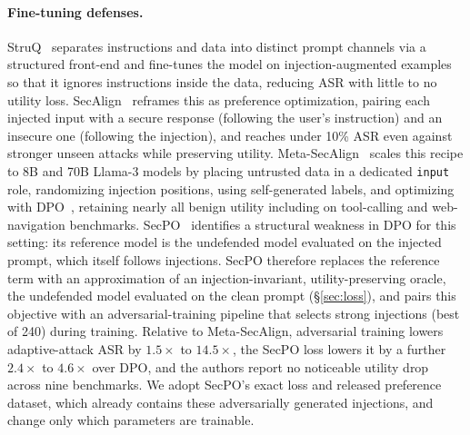 \documentclass{article}
\begin{document}
\paragraph{Fine-tuning defenses.} StruQ~\cite{chen2025struq} separates instructions and data into distinct prompt channels via a structured front-end and fine-tunes the model on injection-augmented examples so that it ignores instructions inside the data, reducing ASR with little to no utility loss. SecAlign~\cite{chen2024secalign} reframes this as preference optimization, pairing each injected input with a secure response (following the user's instruction) and an insecure one (following the injection), and reaches under 10\% ASR even against stronger unseen attacks while preserving utility. Meta-SecAlign~\cite{chen2025metasecalign} scales this recipe to 8B and 70B Llama-3 models by placing untrusted data in a dedicated \texttt{input} role, randomizing injection positions, using self-generated labels, and optimizing with DPO~\cite{rafailov2023dpo}, retaining nearly all benign utility including on tool-calling and web-navigation benchmarks. SecPO~\cite{chen2026secpo} identifies a structural weakness in DPO for this setting: its reference model is the undefended model evaluated on the injected prompt, which itself follows injections. SecPO therefore replaces the reference term with an approximation of an injection-invariant, utility-preserving oracle, the undefended model evaluated on the clean prompt (\S\ref{sec:loss}), and pairs this objective with an adversarial-training pipeline that selects strong injections (best of 240) during training. Relative to Meta-SecAlign, adversarial training lowers adaptive-attack ASR by $1.5\times$ to $14.5\times$, the SecPO loss lowers it by a further $2.4\times$ to $4.6\times$ over DPO, and the authors report no noticeable utility drop across nine benchmarks. We adopt SecPO's exact loss and released preference dataset, which already contains these adversarially generated injections, and change only which parameters are trainable.
\end{document}

